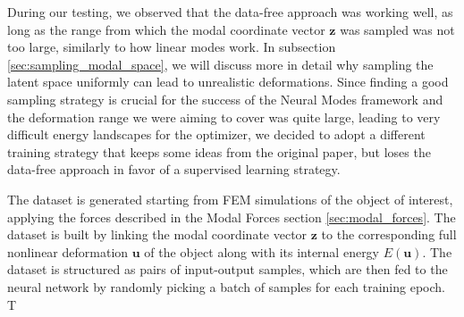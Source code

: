 During our testing, we observed that the data-free approach was working well, as long as the range from which the modal coordinate vector \( \bm{z} \) was sampled was not too large, similarly to how linear modes work. In subsection \ref{sec:sampling_modal_space}, we will discuss more in detail why sampling the latent space uniformly can lead to unrealistic deformations. Since finding a good sampling strategy is crucial for the success of the Neural Modes framework and the deformation range we were aiming to cover was quite large, leading to very difficult energy landscapes for the optimizer, we decided to adopt a different training strategy that keeps some ideas from the original paper, but loses the data-free approach in favor of a supervised learning strategy. 

The dataset is generated starting from FEM simulations of the object of interest, applying the forces described in the Modal Forces section \ref{sec:modal_forces}. The dataset is built by linking the modal coordinate vector \( \bm{z} \) to the corresponding full nonlinear deformation \( \bm{u} \) of the object along with its internal energy \( E(\bm{u}) \). The dataset is structured as pairs of input-output samples, which are then fed to the neural network by randomly picking a batch of samples for each training epoch. T


